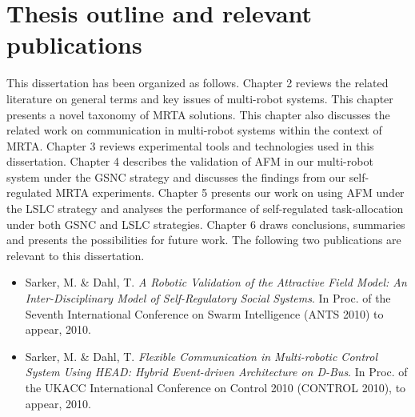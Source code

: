 \section{Thesis outline and relevant publications}
This dissertation has been organized as follows.
Chapter 2 reviews the related literature on general terms and key issues of multi-robot systems. This chapter presents a novel taxonomy of MRTA solutions. This chapter also discusses the related work on communication in multi-robot systems within the context of MRTA.
Chapter 3 reviews experimental tools and technologies used in this dissertation.
Chapter 4 describes the validation of AFM in our multi-robot system under the GSNC strategy and discusses the findings from our self-regulated MRTA experiments.
Chapter 5 presents our work on using AFM under the LSLC strategy and analyses the performance of self-regulated task-allocation under both GSNC and LSLC strategies.
Chapter 6 draws conclusions, summaries and presents the possibilities for future work.
The following two publications are relevant to this dissertation.
\begin{itemize}
\item Sarker, M. \& Dahl, T.\textit{ A Robotic Validation of the Attractive Field Model: An Inter-Disciplinary Model of Self-Regulatory Social Systems}. In Proc. of the Seventh International Conference on Swarm Intelligence (ANTS 2010) to appear, 2010.
\item Sarker, M. \& Dahl, T. \textit{Flexible Communication in Multi-robotic Control System Using HEAD: Hybrid Event-driven Architecture on D-Bus}. In Proc. of the UKACC International Conference on Control 2010 (CONTROL 2010), to appear, 2010.
\end{itemize}
